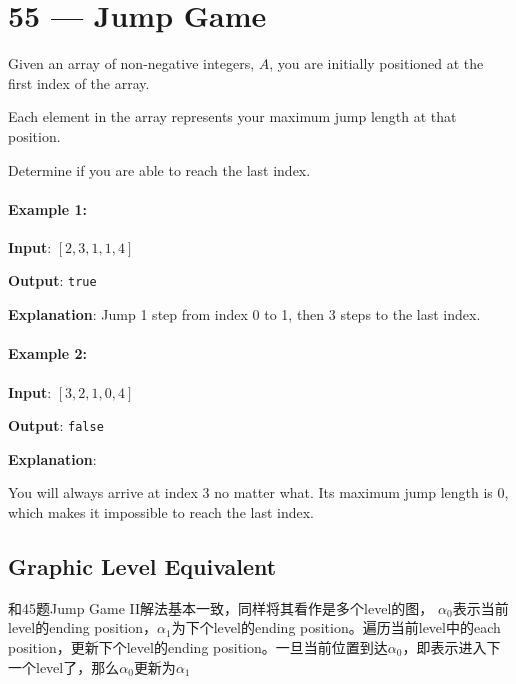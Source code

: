 \section{55 --- Jump Game}
Given an array of non-negative integers, $A$, you are initially positioned at the first index of the array.

Each element in the array represents your maximum jump length at that position.

Determine if you are able to reach the last index.

\paragraph{Example 1:}

\begin{flushleft}
\textbf{Input}: $[2,3,1,1,4]$

\textbf{Output}: \texttt{true}

\textbf{Explanation}: Jump 1 step from index 0 to 1, then 3 steps to the last index.

\end{flushleft}

\paragraph{Example 2:}

\begin{flushleft}
\textbf{Input}: $[3,2,1,0,4]$

\textbf{Output}: \texttt{false}

\textbf{Explanation}: 

You will always arrive at index 3 no matter what. Its maximum jump length is 0, which makes it impossible to reach the last index.
\end{flushleft}


\subsection{Graphic Level Equivalent}
和45题Jump Game II解法基本一致，同样将其看作是多个level的图， $\alpha_0$表示当前level的ending position，$\alpha_1$为下个level的ending position。遍历当前level中的each position，更新下个level的ending position。一旦当前位置到达$\alpha_0$，即表示进入下一个level了，那么$\alpha_0$更新为$\alpha_1$

